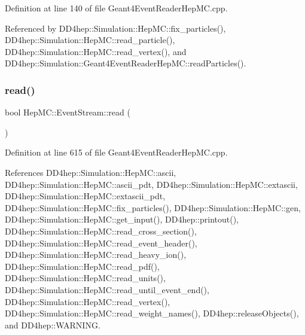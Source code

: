 Definition at line 140 of file Geant4\+Event\+Reader\+Hep\+M\+C.\+cpp.



Referenced by D\+D4hep\+::\+Simulation\+::\+Hep\+M\+C\+::fix\+\_\+particles(), D\+D4hep\+::\+Simulation\+::\+Hep\+M\+C\+::read\+\_\+particle(), D\+D4hep\+::\+Simulation\+::\+Hep\+M\+C\+::read\+\_\+vertex(), and D\+D4hep\+::\+Simulation\+::\+Geant4\+Event\+Reader\+Hep\+M\+C\+::read\+Particles().

\hypertarget{class_d_d4hep_1_1_simulation_1_1_hep_m_c_1_1_event_stream_a0a565ef129dd64aae36e05efc29a4be4}{}\label{class_d_d4hep_1_1_simulation_1_1_hep_m_c_1_1_event_stream_a0a565ef129dd64aae36e05efc29a4be4} 
\subsubsection{\texorpdfstring{read()}{read()}}
{\footnotesize\ttfamily bool Hep\+M\+C\+::\+Event\+Stream\+::read (\begin{DoxyParamCaption}{ }\end{DoxyParamCaption})}



Definition at line 615 of file Geant4\+Event\+Reader\+Hep\+M\+C.\+cpp.



References D\+D4hep\+::\+Simulation\+::\+Hep\+M\+C\+::ascii, D\+D4hep\+::\+Simulation\+::\+Hep\+M\+C\+::ascii\+\_\+pdt, D\+D4hep\+::\+Simulation\+::\+Hep\+M\+C\+::extascii, D\+D4hep\+::\+Simulation\+::\+Hep\+M\+C\+::extascii\+\_\+pdt, D\+D4hep\+::\+Simulation\+::\+Hep\+M\+C\+::fix\+\_\+particles(), D\+D4hep\+::\+Simulation\+::\+Hep\+M\+C\+::gen, D\+D4hep\+::\+Simulation\+::\+Hep\+M\+C\+::get\+\_\+input(), D\+D4hep\+::printout(), D\+D4hep\+::\+Simulation\+::\+Hep\+M\+C\+::read\+\_\+cross\+\_\+section(), D\+D4hep\+::\+Simulation\+::\+Hep\+M\+C\+::read\+\_\+event\+\_\+header(), D\+D4hep\+::\+Simulation\+::\+Hep\+M\+C\+::read\+\_\+heavy\+\_\+ion(), D\+D4hep\+::\+Simulation\+::\+Hep\+M\+C\+::read\+\_\+pdf(), D\+D4hep\+::\+Simulation\+::\+Hep\+M\+C\+::read\+\_\+units(), D\+D4hep\+::\+Simulation\+::\+Hep\+M\+C\+::read\+\_\+until\+\_\+event\+\_\+end(), D\+D4hep\+::\+Simulation\+::\+Hep\+M\+C\+::read\+\_\+vertex(), D\+D4hep\+::\+Simulation\+::\+Hep\+M\+C\+::read\+\_\+weight\+\_\+names(), D\+D4hep\+::release\+Objects(), and D\+D4hep\+::\+W\+A\+R\+N\+I\+NG.



